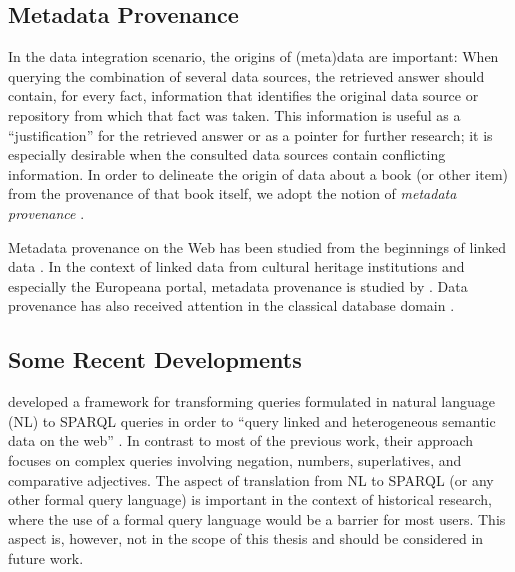 \subsection{Metadata Provenance}
\label{sec:data_provenance}

In the data integration scenario, the origins of (meta)data are important:
When querying the combination of several data sources, the retrieved answer
should contain, for every fact, information that identifies the original data source or repository
from which that fact was taken.
This information is useful as a \enquote{justification} for the retrieved answer
or as a pointer for further research;
it is especially desirable when the consulted data sources contain conflicting information.
In order to delineate the origin of data about a book (or other item)
from the provenance of that book itself,
we adopt the notion of \emph{metadata provenance} \autocite{Eckert2012}.

Metadata provenance on the Web
has been studied
from the beginnings of linked data
\autocite[see, e.g.][]{Hartig2009,Moreau2008,Moreau2008a}.
In the context of linked data from cultural heritage institutions
and especially the Europeana portal,
metadata provenance is studied by
\citeauthor{Eckert2013} \autocite*{Eckert2013,Eckert2013a,Eckert2012}.
Data provenance has also received attention 
in the classical database domain
\autocite[see, e.g.,][§14]{Doan2012}.

\subsection{Some Recent Developments}


\textcite{Boumechaal2023} developed a framework for transforming queries formulated in natural language (NL)
to SPARQL queries in order to \enquote{query linked and heterogeneous semantic data on the web}
\autocite[p.1]{Boumechaal2023}.
In contrast to most of the previous work, their approach focuses on complex queries
involving negation, numbers, superlatives, and comparative adjectives.
The aspect of translation from NL to SPARQL (or any other formal query language)
is important in the context of historical research, where the use of a formal query language
would be a barrier for most users. This aspect is, however, not in the scope of this thesis
and should be considered in future work.

